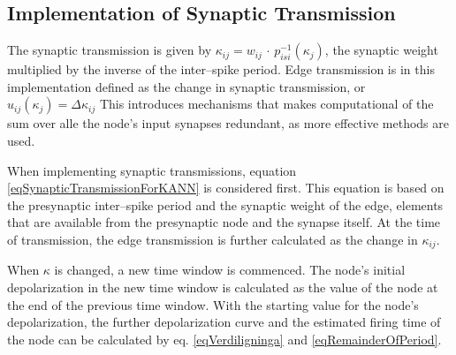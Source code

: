 			\subsection{Implementation of Synaptic Transmission}
			\label{ssecImpOfSynTransmissionKANNN}
	
	
			The synaptic transmission is given by $\kappa_{ij} = w_{ij} \, \cdot \, p_{isi}^{-1}(\kappa_j)$, the synaptic weight multiplied by the inverse of the inter--spike period.
			Edge transmission is in this implementation defined as the change in synaptic transmission, or $u_{ij}(\kappa_j) = \Delta \kappa_{ij}$
			This introduces mechanisms that makes computational of the sum over alle the node's input synapses redundant, as more effective methods are used. %
	
			When implementing synaptic transmissions, equation \eqref{eqSynapticTransmissionForKANN} is considered first.
			This equation is based on the presynaptic inter--spike period and the synaptic weight of the edge, elements that are available from the presynaptic node and the synapse itself.
			At the time of transmission, the edge transmission is further calculated as the change in $\kappa_{ij}$.
			
			When $\kappa$ is changed, a new time window is commenced. 
			The node's initial depolarization in the new time window is calculated as the value of the node at the end of the previous time window.
			With the starting value for the node's depolarization, the further depolarization curve and the estimated firing time of the node can be calculated by eq. \eqref{eqVerdiligninga} and \eqref{eqRemainderOfPeriod}.

